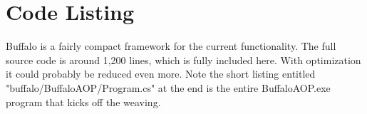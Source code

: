 \chapter{Code Listing}

Buffalo is a fairly compact framework for the current functionality. The full source code is around 1,200 lines, which is fully included here. With optimization it could probably be reduced even more. Note the short listing entitled "buffalo/BuffaloAOP/Program.cs" at the end is the entire BuffaloAOP.exe program that kicks off the weaving.

\vspace{5mm}

